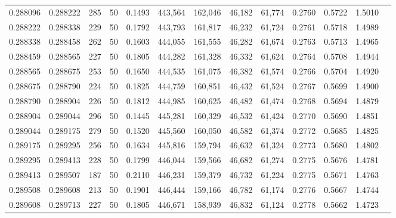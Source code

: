 \begin{tabular}{rrrrrrrrrrrrr}
0.288096 & 0.288222 &   285 &  50 &                                     0.1493 & 443,564 & 162,046 &  46,182 &  61,774 & 0.2760 & 0.5722 & 1.5010 \\
0.288222 & 0.288338 &   229 &  50 &                                     0.1792 & 443,793 & 161,817 &  46,232 &  61,724 & 0.2761 & 0.5718 & 1.4989 \\
0.288338 & 0.288458 &   262 &  50 &                                     0.1603 & 444,055 & 161,555 &  46,282 &  61,674 & 0.2763 & 0.5713 & 1.4965 \\
0.288459 & 0.288565 &   227 &  50 &                                     0.1805 & 444,282 & 161,328 &  46,332 &  61,624 & 0.2764 & 0.5708 & 1.4944 \\
0.288565 & 0.288675 &   253 &  50 &                                     0.1650 & 444,535 & 161,075 &  46,382 &  61,574 & 0.2766 & 0.5704 & 1.4920 \\
0.288675 & 0.288790 &   224 &  50 &                                     0.1825 & 444,759 & 160,851 &  46,432 &  61,524 & 0.2767 & 0.5699 & 1.4900 \\
0.288790 & 0.288904 &   226 &  50 &                                     0.1812 & 444,985 & 160,625 &  46,482 &  61,474 & 0.2768 & 0.5694 & 1.4879 \\
0.288904 & 0.289044 &   296 &  50 &                                     0.1445 & 445,281 & 160,329 &  46,532 &  61,424 & 0.2770 & 0.5690 & 1.4851 \\
0.289044 & 0.289175 &   279 &  50 &                                     0.1520 & 445,560 & 160,050 &  46,582 &  61,374 & 0.2772 & 0.5685 & 1.4825 \\
0.289175 & 0.289295 &   256 &  50 &                                     0.1634 & 445,816 & 159,794 &  46,632 &  61,324 & 0.2773 & 0.5680 & 1.4802 \\
0.289295 & 0.289413 &   228 &  50 &                                     0.1799 & 446,044 & 159,566 &  46,682 &  61,274 & 0.2775 & 0.5676 & 1.4781 \\
0.289413 & 0.289507 &   187 &  50 &                                     0.2110 & 446,231 & 159,379 &  46,732 &  61,224 & 0.2775 & 0.5671 & 1.4763 \\
0.289508 & 0.289608 &   213 &  50 &                                     0.1901 & 446,444 & 159,166 &  46,782 &  61,174 & 0.2776 & 0.5667 & 1.4744 \\
0.289608 & 0.289713 &   227 &  50 &                                     0.1805 & 446,671 & 158,939 &  46,832 &  61,124 & 0.2778 & 0.5662 & 1.4723 \\

\end{tabular}
